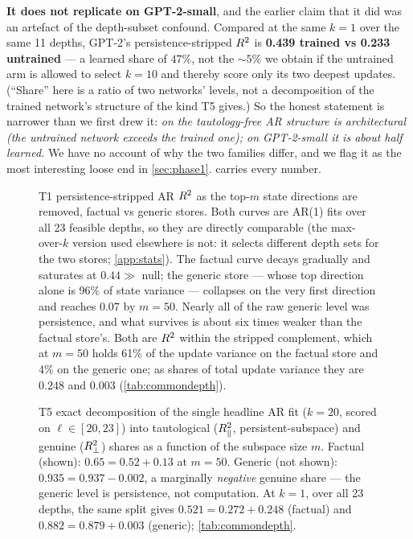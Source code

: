 \textbf{It does not replicate on GPT-2-small}, and the earlier claim that it
did was an artefact of the depth-subset confound. Compared at the same
$k{=}1$ over the same 11 depths, GPT-2's persistence-stripped $R^2$ is
\textbf{0.439 trained vs 0.233 untrained} --- a learned share of $47\%$, not
the ${\sim}5\%$ we obtain if the untrained arm is allowed to select $k{=}10$
and thereby score only its two deepest updates. (``Share'' here is a ratio
of two networks' levels, not a decomposition of the trained network's
structure of the kind T5 gives.) So the honest statement is
narrower than we first drew it: \emph{on \pythia{} the tautology-free
AR structure is architectural (the untrained network exceeds the trained one);
on GPT-2-small it is about half learned.} We have no account of why the two
families differ, and we flag it as the most interesting loose end in
\cref{sec:phase1}.  carries every number.

\begin{figure}[t]
  \centering
  
  \caption{T1 persistence-stripped AR $R^2$ as the top-$m$ state directions
  are removed, factual vs generic stores. Both curves are AR(1) fits over all
  23 feasible depths, so they are directly comparable (the max-over-$k$
  version used elsewhere is not: it selects different depth sets for the two
  stores; \cref{app:stats}). The factual curve decays
  gradually and saturates at $0.44 \gg$ null; the generic store --- whose top
  direction alone is 96\% of state variance --- collapses on the very first
  direction and reaches $0.07$ by $m{=}50$. Nearly all of the raw generic
  level was persistence, and what survives is about six times weaker than
  the factual store's. Both are $R^2$ within the stripped complement, which
  at $m{=}50$ holds 61\% of the update variance on the factual store and 4\%
  on the generic one; as shares of total update variance they are $0.248$
  and $0.003$ (\cref{tab:commondepth}).}
  \label{fig:t1}
\end{figure}

\begin{figure}[t]
  \centering
  
  \caption{T5 exact decomposition of the single headline AR fit ($k{=}20$,
  scored on $\ell \in [20,23]$) into
  tautological ($R^2_{\parallel}$, persistent-subspace) and genuine
  ($R^2_{\perp}$) shares as a function of the subspace size $m$. Factual
  (shown): $0.65 = 0.52 + 0.13$ at $m{=}50$. Generic (not shown):
  $0.935 = 0.937 - 0.002$, a marginally \emph{negative} genuine share --- the
  generic level is persistence, not computation. At $k{=}1$, over all 23
  depths, the same split gives $0.521 = 0.272 + 0.248$ (factual) and
  $0.882 = 0.879 + 0.003$ (generic); \cref{tab:commondepth}.}
  \label{fig:t5}
\end{figure}

